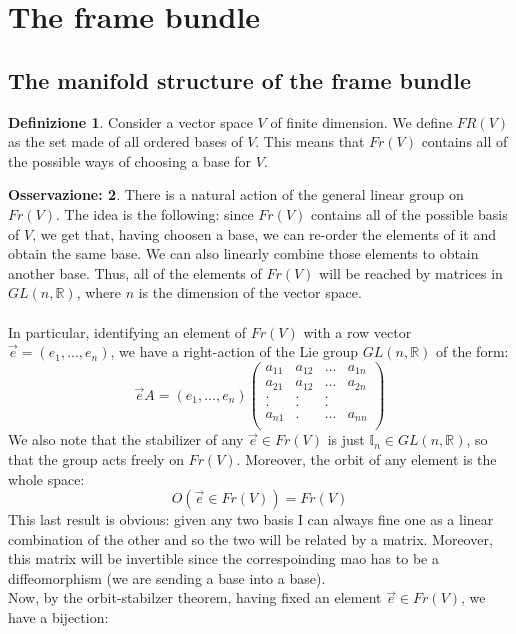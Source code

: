 \documentclass[12pt,a4paper]{report}
\theoremstyle{definition}
\newtheorem{Def}{Definizione}[chapter]
\theoremstyle{Theorem}
\theoremstyle{definition}
\theoremstyle{definition}
\theoremstyle{definition}
\newtheorem{Obs}[Def]{Osservazione:}
\begin{document}
	\section{The frame bundle}
	\subsection{The manifold structure of the frame bundle}
	\begin{Def}
		Consider a vector space $V$ of finite dimension. We define $FR(V)$ as the set made of all ordered bases of $V$. This means that $Fr(V)$ contains all of the possible ways of choosing a base for $V$.
	\end{Def}
	\begin{Obs}
		There is a natural action of the general linear group on $Fr(V)$. The idea is the following: since $Fr(V)$ contains all of the possible basis of $V$, we get that, having choosen a base, we can re-order the elements of it and obtain the same base. We can also linearly combine those elements to obtain another base. Thus, all of the elements of $Fr(V)$ will be reached by matrices in $GL(n,\mathbb{R})$, where $n$ is the dimension of the vector space.\\
		\\
		In particular, identifying an element of $Fr(V)$ with a row vector $\vec{e}=(e_1,...,e_n)$, we have a right-action of the Lie group $GL(n,\mathbb{R})$ of the form:
		$$\vec{e}A=(e_1,...,e_n)\begin{pmatrix}
			a_{11}&a_{12}&...&a_{1n}\\
			a_{21}&a_{12}&...&a_{2n}\\
			.     &.     &.   &     \\
			.     &.     &.   &     \\
			a_{n1}&.     &...&a_{nn}\\
		\end{pmatrix}$$
		We also note that the stabilizer of any $\vec{e}\in Fr(V)$ is just $\mathbb{I}_n\in GL(n,\mathbb{R})$, so that the group acts freely on $Fr(V)$. Moreover, the orbit of any element is the whole space: 
		$$O(\vec{e}\in Fr(V))=Fr(V)$$
		This last result is obvious: given any two basis I can always fine one as a linear combination of the other and so the two will be related by a matrix. Moreover, this matrix will be invertible since the correspoinding mao has to be a diffeomorphism (we are sending a base into a base).\\
		Now, by the orbit-stabilzer theorem, having fixed an element $\vec{e}\in Fr(V)$, we have a bijection:

\end{Obs}
\end{document}
